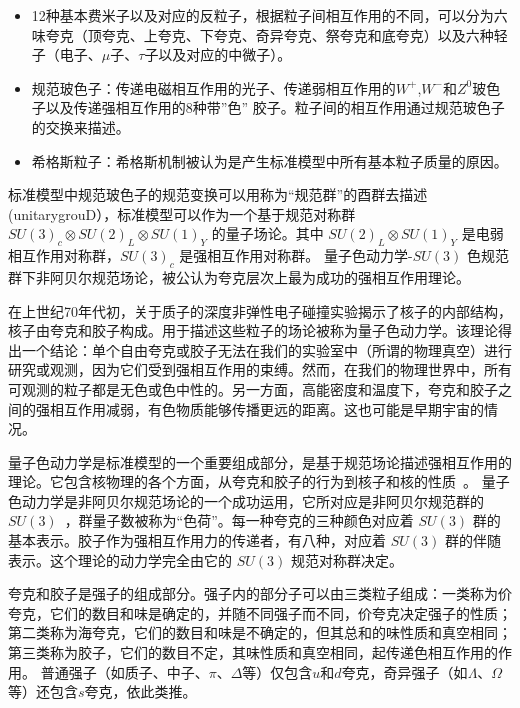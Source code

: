   \begin{itemize}
	\item 12种基本费米子以及对应的反粒子，根据粒子间相互作用的不同，可以分为六味夸克（顶夸克、上夸克、下夸克、奇异夸克、祭夸克和底夸克）以及六种轻子（电子、$\mu$子、$\tau$子以及对应的中微子）。
	\item 规范玻色子：传递电磁相互作用的光子、传递弱相互作用的$W^+$,$W^-$和$Z^0$玻色子以及传递强相互作用的8种带”色” 胶子。粒子间的相互作用通过规范玻色子的交换来描述。
	\item 希格斯粒子：希格斯机制被认为是产生标准模型中所有基本粒子质量的原因。
\end{itemize}

标准模型中规范玻色子的规范变换可以用称为“规范群”的酉群去描述 (unitarygrouD），标准模型可以作为一个基于规范对称群 $SU(3)_c \otimes SU(2)_L \otimes SU(1)_Y$ 的量子场论。其中 $SU(2)_L \otimes SU(1)_Y$ 是电弱相互作用对称群，$SU(3)_c$ 是强相互作用对称群。
量子色动力学-$SU(3)$ 色规范群下非阿贝尔规范场论，被公认为夸克层次上最为成功的强相互作用理论。

\fi


	在上世纪70年代初，关于质子的深度非弹性电子碰撞实验揭示了核子的内部结构，核子由夸克和胶子构成。用于描述这些粒子的场论被称为量子色动力学。该理论得出一个结论：单个自由夸克或胶子无法在我们的实验室中（所谓的物理真空）进行研究或观测，因为它们受到强相互作用的束缚。然而，在我们的物理世界中，所有可观测的粒子都是无色或色中性的。另一方面，高能密度和温度下，夸克和胶子之间的强相互作用减弱，有色物质能够传播更远的距离。这也可能是早期宇宙的情况。

	量子色动力学是标准模型的一个重要组成部分，是基于规范场论描述强相互作用的理论。它包含核物理的各个方面，从夸克和胶子的行为到核子和核的性质~\parencite{Achenbach:2023pba}。
	量子色动力学是非阿贝尔规范场论的一个成功运用，它所对应是非阿贝尔规范群的 $SU(3)$~\parencite{Gross:1973id,Politzer:1973fx}，群量子数被称为“色荷”。每一种夸克的三种颜色对应着 $SU(3)$ 群的基本表示。胶子作为强相互作用力的传递者，有八种，对应着 $SU(3)$ 群的伴随表示。这个理论的动力学完全由它的 $SU(3)$ 规范对称群决定。
	
	夸克和胶子是强子的组成部分。强子内的部分子可以由三类粒子组成：一类称为价夸克，它们的数目和味是确定的，并随不同强子而不同，价夸克决定强子的性质；第二类称为海夸克，它们的数目和味是不确定的，但其总和的味性质和真空相同；第三类称为胶子，它们的数目不定，其味性质和真空相同，起传递色相互作用的作用。
	普通强子（如质子、中子、$\pi$、$\Delta$等）仅包含$u$和$d$夸克，奇异强子（如$\Lambda$、$\Omega$等）还包含$s$夸克，依此类推。

